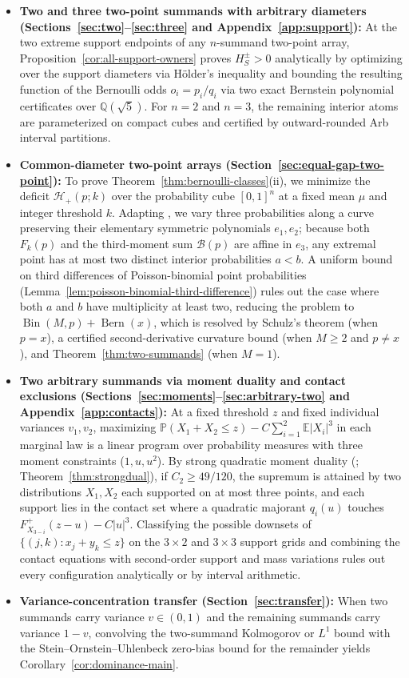 \documentclass[11pt]{article}
\numberwithin{equation}{section}
\theoremstyle{definition}
\theoremstyle{remark}
\DeclareMathOperator{\Bern}{Bern}
\DeclareMathOperator{\Bin}{Bin}
\newcommand{\E}{\mathbb E}
\newcommand{\Pp}{\mathbb P}
\begin{document}
\begin{itemize}[leftmargin=2em]
\item \textbf{Two and three two-point summands with arbitrary diameters
(Sections~\ref{sec:two}--\ref{sec:three} and Appendix~\ref{app:support}):}
At the two extreme support endpoints of any $n$-summand two-point array,
Proposition~\ref{cor:all-support-owners} proves $H_S^\pm>0$ analytically by
optimizing over the support diameters via H\"older's inequality and bounding
the resulting function of the Bernoulli odds $o_i=p_i/q_i$ via two exact
Bernstein polynomial certificates over $\mathbb Q(\sqrt5)$. For $n=2$ and
$n=3$, the remaining interior atoms are parameterized on compact cubes and
certified by outward-rounded Arb interval partitions.
\item \textbf{Common-diameter two-point arrays (Section~\ref{sec:equal-gap-two-point}):}
To prove Theorem~\ref{thm:bernoulli-classes}(ii), we minimize the deficit
$\mathcal H_+(p;k)$ over the probability cube $[0,1]^n$ at a fixed mean $\mu$
and integer threshold $k$. Adapting \citet{Mattner2022}, we vary three
probabilities along a curve preserving their elementary symmetric polynomials
$e_1,e_2$; because both $F_k(p)$ and the third-moment sum $\mathcal B(p)$ are
affine in $e_3$, any extremal point has at most two distinct interior
probabilities $a<b$. A uniform bound on third differences of Poisson-binomial
point probabilities (Lemma~\ref{lem:poisson-binomial-third-difference}) rules
out the case where both $a$ and $b$ have multiplicity at least two, reducing
the problem to $\Bin(M,p)+\Bern(x)$, which is resolved by Schulz's theorem
(when $p=x$), a certified second-derivative curvature bound (when $M\ge2$ and
$p\ne x$), and Theorem~\ref{thm:two-summands} (when $M=1$).
\item \textbf{Two arbitrary summands via moment duality and contact
exclusions (Sections~\ref{sec:moments}--\ref{sec:arbitrary-two} and
Appendix~\ref{app:contacts}):}
At a fixed threshold $z$ and fixed individual variances $v_1,v_2$, maximizing
$\Pp(X_1+X_2\le z)-C\sum_{i=1}^2\E|X_i|^3$ in each marginal law is a linear
program over probability measures with three moment constraints ($1,u,u^2$).
By strong quadratic moment duality (\citet{Winkler1988,BertsimasPopescu2005};
Theorem~\ref{thm:strongdual}), if $C_2\ge49/120$, the supremum is attained by
two distributions $X_1,X_2$ each supported on at most three points, and each
support lies in the contact set where a quadratic majorant $q_i(u)$ touches
$F_{X_{3-i}}^+(z-u)-C|u|^3$. Classifying the possible downsets of
$\{(j,k):x_j+y_k\le z\}$ on the $3\times2$ and $3\times3$ support grids and
combining the contact equations with second-order support and mass variations
rules out every configuration analytically or by interval arithmetic.
\item \textbf{Variance-concentration transfer (Section~\ref{sec:transfer}):}
When two summands carry variance $v\in(0,1)$ and the remaining summands
carry variance $1-v$, convolving the two-summand Kolmogorov or $L^1$ bound
with the Stein--Ornstein--Uhlenbeck zero-bias bound for the remainder yields
Corollary~\ref{cor:dominance-main}.
\end{itemize}
\end{document}
